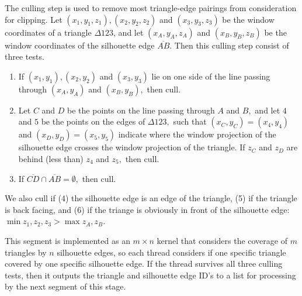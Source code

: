 \documentclass[review]{acmsiggraph}
\begin{document}
The culling step is used to remove most triangle-edge pairings from
consideration for clipping.
Let $(x_1,y_1,z_1), (x_2,y_2,z_2)$ and $(x_3,y_3,z_3)$ be the window
coordinates of a triangle $\Delta 123$, and let $(x_A,y_A,z_A)$ and
$(x_B,y_B,z_B)$ be the window coordinates of the silhouette edge
$\overline{AB}$. Then this culling step consist of three tests.
\begin{enumerate}
\item If $(x_1,y_1), (x_2,y_2)$ and $(x_3,y_3)$ lie on one side of the line
passing through $(x_A,y_A)$ and $(x_B,y_B),$ then cull.
\item Let $C$ and $D$ be the points on the line passing through $A$ and $B,$
and let $4$ and $5$ be the points on the edges of $\Delta 123,$ such that
$(x_C,y_C) = (x_4,y_4)$ and $(x_D,y_D) = (x_5,y_5)$ indicate where the
window projection of the silhouette edge crosses the window projection of the
triangle. If $z_C$ and $z_D$ are behind (less than) $z_4$ and $z_5,$ then cull.
\item If $\overline{CD} \cap \overline{AB} = \emptyset,$ then cull.
\end{enumerate}

We also cull if (4) the silhouette edge is an edge of the triangle, (5) if the
triangle is back facing, and (6) if the triange is obviously in front of the
silhouette edge: $\min z_1,z_2,z_3 > \max z_A,z_B.$

This segment is implemented as an $m \times n$ kernel that considers the
coverage of $m$ triangles by $n$ silhouette edges, so each thread considers
if one specific triangle covered by one specific silhouette edge. If the
thread survives all three culling tests, then it outputs the triangle and
silhouette edge ID's to a list for processing by the next segment of this
stage.

\end{document}
